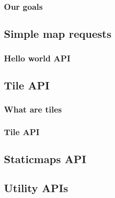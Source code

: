 \documentclass[17pt]{beamer}
\begin{document}
\begin{frame}
  \frametitle{Our goals}

\end{frame}

\subsection{Simple map requests}

\begin{frame}[fragile]
  \frametitle{Hello world API}
  \begin{block}{}
    \only<1>{
      
    }
    \only<2>{
      
    }
  \end{block}
\end{frame}

\subsection{Tile API}

\begin{frame}
  \frametitle{What are tiles}

\end{frame}

\begin{frame}[fragile]
  \frametitle{Tile API}
  \begin{block}{}
    \only<1>{
      
    }
    \only<2>{
      
    }
  \end{block}
\end{frame}

\subsection{Staticmaps API}

\subsection{Utility APIs}
\end{document}

